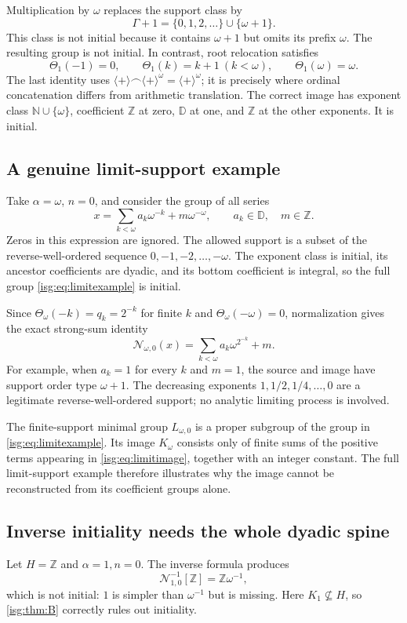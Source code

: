 \documentclass[11pt]{article}
\theoremstyle{definition}
\theoremstyle{remark}
\newcommand{\Z}{\mathbb{Z}}
\newcommand{\N}{\mathbb{N}}
\newcommand{\D}{\mathbb{D}}
\newcommand{\cat}{\mathbin{\frown}}
\newcommand{\plus}{\langle+\rangle}
\begin{document}
Multiplication by $\omega$ replaces the support class by
\[
 \Gamma+1=\{0,1,2,\ldots\}\cup\{\omega+1\}.
\]
This class is not initial because it contains $\omega+1$ but omits
its prefix $\omega$. The resulting group is not initial. In contrast,
root relocation satisfies
\[
 \Theta_1(-1)=0,\qquad
 \Theta_1(k)=k+1\ (k<\omega),\qquad
 \Theta_1(\omega)=\omega.
\]
The last identity uses $\plus\cat\plus^\omega=\plus^\omega$;
it is precisely where ordinal concatenation differs from arithmetic
translation. The correct image has exponent class
$\N\cup\{\omega\}$, coefficient $\Z$ at zero, $\D$ at one,
and $\Z$ at the other exponents. It is initial.

\subsection{A genuine limit-support example}
Take $\alpha=\omega$, $n=0$, and consider the group of all series
\begin{equation}\label{isg:eq:limitexample}
 x=\sum_{k<\omega}a_k\omega^{-k}+m\omega^{-\omega},
 \qquad a_k\in\D,\quad m\in\Z.
\end{equation}
Zeros in this expression are ignored. The allowed support is a subset
of the reverse-well-ordered sequence
$0,-1,-2,\ldots,-\omega$. The exponent class is initial, its ancestor
coefficients are dyadic, and its bottom coefficient is integral, so the
full group \eqref{isg:eq:limitexample} is initial.

Since $\Theta_\omega(-k)=q_k=2^{-k}$ for finite $k$ and
$\Theta_\omega(-\omega)=0$, normalization gives the exact strong-sum
identity
\begin{equation}\label{isg:eq:limitimage}
 \mathcal N_{\omega,0}(x)
   =\sum_{k<\omega}a_k\omega^{2^{-k}}+m.
\end{equation}
For example, when $a_k=1$ for every $k$ and $m=1$, the source and image
have support order type $\omega+1$. The decreasing exponents
$1,1/2,1/4,\ldots,0$ are a legitimate reverse-well-ordered support;
no analytic limiting process is involved.

The finite-support minimal group $L_{\omega,0}$ is a proper subgroup of
the group in \eqref{isg:eq:limitexample}. Its image $K_\omega$ consists
only of finite sums of the positive terms appearing in
\eqref{isg:eq:limitimage}, together with an integer constant. The full
limit-support example therefore illustrates why the image cannot be
reconstructed from its coefficient groups alone.

\subsection{Inverse initiality needs the whole dyadic spine}
Let $H=\Z$ and $\alpha=1,n=0$. The inverse formula produces
\[
 \mathcal N_{1,0}^{-1}[\Z]=\Z\omega^{-1},
\]
which is not initial: $1$ is simpler than $\omega^{-1}$ but is missing.
Here $K_1\not\subseteq H$, so \cref{isg:thm:B} correctly rules out
initiality.
\end{document}
